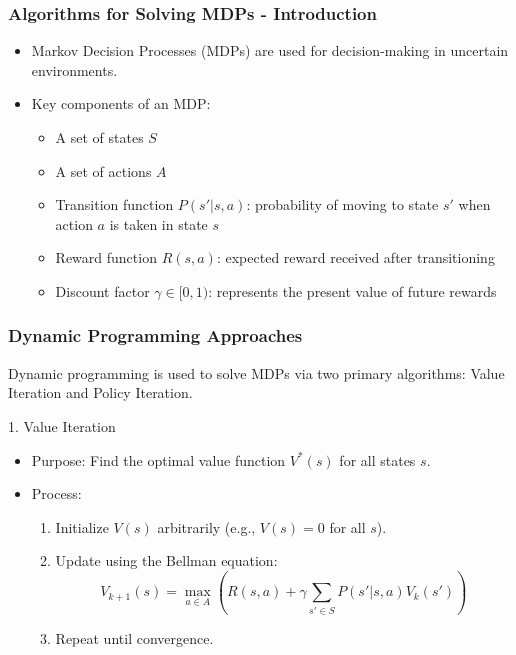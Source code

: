 \documentclass[aspectratio=169]{beamer}
\begin{document}
\begin{frame}[fragile]
    \frametitle{Algorithms for Solving MDPs - Introduction}
    \begin{itemize}
        \item Markov Decision Processes (MDPs) are used for decision-making in uncertain environments.
        \item Key components of an MDP:
        \begin{itemize}
            \item A set of states $S$
            \item A set of actions $A$
            \item Transition function $P(s'|s,a)$: probability of moving to state $s'$ when action $a$ is taken in state $s$
            \item Reward function $R(s,a)$: expected reward received after transitioning
            \item Discount factor $\gamma \in [0,1)$: represents the present value of future rewards
        \end{itemize}
    \end{itemize}
\end{frame}

\begin{frame}[fragile]
    \frametitle{Dynamic Programming Approaches}
    Dynamic programming is used to solve MDPs via two primary algorithms: Value Iteration and Policy Iteration.
    
    \begin{block}{1. Value Iteration}
        \begin{itemize}
            \item Purpose: Find the optimal value function $V^*(s)$ for all states $s$.
            \item Process:
            \begin{enumerate}
                \item Initialize $V(s)$ arbitrarily (e.g., $V(s) = 0$ for all $s$).
                \item Update using the Bellman equation:
                \begin{equation}
                V_{k+1}(s) = \max_{a \in A} \left( R(s, a) + \gamma \sum_{s' \in S} P(s' | s, a) V_k(s') \right)
                \end{equation}
                \item Repeat until convergence.
            \end{enumerate}
        \end{itemize}
    \end{block}
\end{frame}
\end{document}
